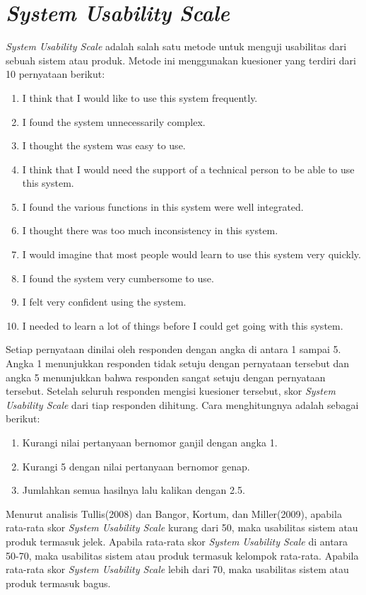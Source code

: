 \section{\textit{System Usability Scale} ~\cite{albert2013measuring}}
\textit{System Usability Scale} adalah salah satu metode untuk menguji usabilitas dari sebuah sistem atau produk. Metode ini menggunakan kuesioner yang terdiri dari 10 pernyataan berikut:
\begin{enumerate}
	\item I think that I would like to use this system frequently.
	\item I found the system unnecessarily complex.
	\item I thought the system was easy to use.
	\item I think that I would need the support of a technical person to be able to use this system.
	\item I found the various functions in this system were well integrated.
	\item I thought there was too much inconsistency in this system.
	\item I would imagine that most people would learn to use this system very quickly.
	\item I found the system very cumbersome to use.
	\item I felt very confident using the system.
	\item I needed to learn a lot of things before I could get going with this system.
\end{enumerate}
Setiap pernyataan dinilai oleh responden dengan angka di antara 1 sampai 5. Angka 1 menunjukkan responden tidak setuju dengan pernyataan tersebut dan angka 5 menunjukkan bahwa responden sangat setuju dengan pernyataan tersebut.
Setelah seluruh responden mengisi kuesioner tersebut, skor \textit{System Usability Scale} dari tiap responden dihitung. Cara menghitungnya adalah sebagai berikut:
\begin{enumerate}
	\item Kurangi nilai pertanyaan bernomor ganjil dengan angka 1.
	\item Kurangi 5 dengan nilai pertanyaan bernomor genap.
	\item Jumlahkan semua hasilnya lalu kalikan dengan 2.5.
\end{enumerate}
Menurut analisis Tullis(2008) dan Bangor, Kortum, dan Miller(2009), apabila rata-rata skor \textit{System Usability Scale} kurang dari 50, maka usabilitas sistem atau produk termasuk jelek. Apabila rata-rata skor \textit{System Usability Scale} di antara 50-70, maka usabilitas sistem atau produk termasuk kelompok rata-rata. Apabila rata-rata skor \textit{System Usability Scale} lebih dari 70, maka usabilitas sistem atau produk termasuk bagus. 